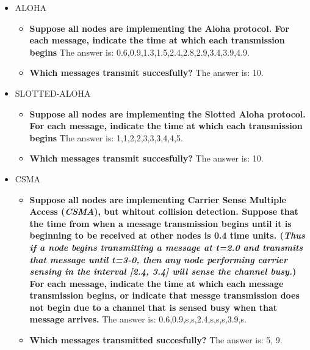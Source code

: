    \begin{itemize}
        \item ALOHA
        \begin{itemize}
            \item\textbf{Suppose all nodes are implementing the Aloha protocol. For each message, indicate the time at which each transmission begins}
            The answer is: 0.6,0.9,1.3,1.5,2.4,2.8,2.9,3.4,3.9,4.9.
            \item\textbf{Which messages transmit succesfully?} The answer is: 10.
        \end{itemize}
        
        \item SLOTTED-ALOHA
        \begin{itemize}
            \item\textbf{Suppose all nodes are implementing the Slotted Aloha protocol. For each message, indicate the time at which each transmission begins}
            The answer is: 1,1,2,2,3,3,3,4,4,5.
            \item\textbf{Which messages transmit succesfully?} The answer is: 10.
        \end{itemize}
        
        \newpage
        \item CSMA
        \begin{itemize}
            \item\textbf{Suppose all nodes are implementing Carrier Sense Multiple Access (\textit{CSMA}), but whitout collision detection. Suppose that the time
            from when a message transmission begins until it is beginning to be received at other nodes is 0.4 time units. (\textit{Thus if a node begins 
            transmitting a message at t=2.0 and transmits that message until t=3-0, then any node performing carrier sensing in the interval [2.4, 3.4] will 
            sense the channel busy.}) For each message, indicate the time at which each message transmission begins, or indicate that messge transmission does not
            begin due to a channel that is sensed busy when that message arrives.}
            The answer is: 0.6,0.9,s,s,2.4,s,s,s,3.9,s.
            \item\textbf{Which messages transmitted succesfully?} The answer is: 5, 9.
        \end{itemize}
        

\end{itemize}
